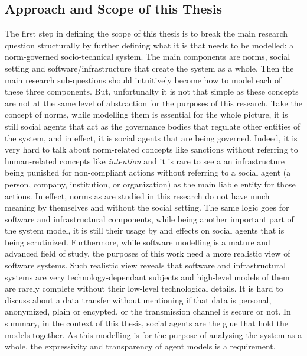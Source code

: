 \subsection{Approach and Scope of this Thesis}
The first step in defining the scope of this thesis is to break the main research question structurally by further defining what it is that needs to be modelled: a norm-governed socio-technical system. The main components are norms, social setting and software/infrastructure that create the system as a whole, 
Then the main research sub-questions should intuitively become how to model each of these three components. But, unfortunalty it is not that simple as these concepts are not at the same level of abstraction for the purposes of this research. 
Take the concept of norms, while modelling them is essential for the whole picture, it is still social agents that act as the governance bodies that regulate other entities of the system, and in effect, it is social agents that are being governed. Indeed, it is very hard to talk about norm-related concepts like sanctions without referring to human-related concepts like \textit{intention} and it is rare to see a an infrastructure being punished for non-compliant actions without referring to a social agent (a person, company, institution, or organization) as the main liable entity for those actions. In effect, norms as are studied in this research do not have much meaning by themselves and without the social setting. The same logic goes for software and infrastructural components, while being another important part of the system model, it is still their usage by and effects on social agents that is being scrutinized. Furthermore, while software modelling is a mature and advanced field of study, the purposes of this work need a more realistic view of software systems. Such realistic view reveals that software and infrastructural systems are very technology-dependant subjects and high-level models of them are rarely complete without their low-level technological details. It is hard to discuss about a data transfer without mentioning if that data is personal, anonymized, plain or encypted, or the transmission channel is secure or not. In summary, in the context of this thesis, social agents are the glue that hold the models together. As this modelling is for the purpose of analysing the system as a whole, the expressivity and transparency of agent models is a requirement.


